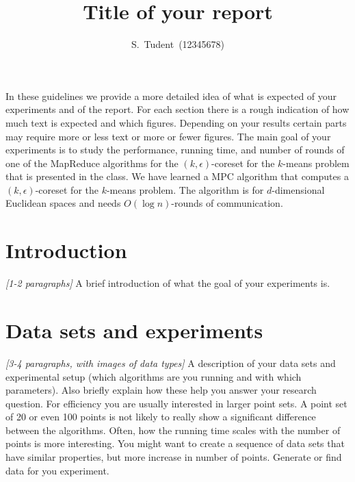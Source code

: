 \documentclass[11pt]{article}
\title{Title of your report}
\author{S.~Tudent~(12345678)}
\date{}
\begin{document}
\maketitle

In these guidelines we provide a more detailed idea of what is expected of your experiments and of the report. For each section there is a rough indication of how much text is expected and which figures. Depending on your results certain parts may require more or less text or more or fewer figures. 
The main goal of your experiments is to study the performance, running time, and number of rounds of one of the 
MapReduce algorithms for the $(k,\epsilon)$-coreset for the $k$-means problem 
that is presented in the class. 
We have learned a MPC algorithm that computes a $(k,\epsilon)$-coreset for the $k$-means problem. 
The algorithm is for $d$-dimensional Euclidean spaces and needs  $O(\log n)$-rounds of communication.


\section{Introduction}
\label{se:introduction}
\emph{[1-2 paragraphs]}
A brief introduction of what the goal of your experiments is.


\section{Data sets and experiments}
\label{se:algorithms}
\emph{[3-4 paragraphs, with images of data types]}
A description of your data sets and experimental setup (which algorithms are you running and with which parameters). Also briefly explain how these help you answer your research question. For efficiency you are usually interested in larger point sets. A point set of 20 or even 100 points is not likely to really show a significant difference between the algorithms. Often, how the running time scales with the number of points is more interesting. You might want to create a sequence of data sets that have similar properties, but more increase in number of points. 
Generate or find data for you experiment. 
\end{document}
